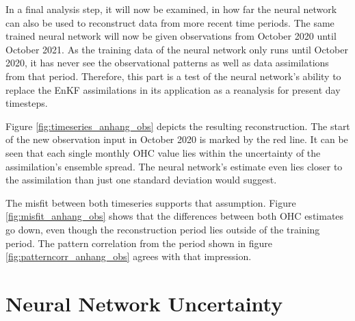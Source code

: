 \documentclass[Masterarbeit.tex]{subfile}
\begin{document}
	In a final analysis step, it will now be examined, in how far the neural network can also be used to reconstruct data from more recent time periods. The same trained neural network will now be given observations from October 2020 until October 2021. As the training data of the neural network only runs until October 2020, it has never see the observational patterns as well as data assimilations from that period. Therefore, this part is a test of the neural network's ability to replace the EnKF assimilations in its application as a reanalysis for present day timesteps. 
	
	
	Figure \ref{fig:timeseries_anhang_obs} depicts the resulting reconstruction. The start of the new observation input in October 2020 is marked by the red line. It can be seen that each single monthly OHC value lies within the uncertainty of the assimilation's ensemble spread. The neural network's estimate even lies closer to the assimilation than just one standard deviation would suggest. 
	
	
	The misfit between both timeseries supports that assumption. Figure \ref{fig:misfit_anhang_obs} shows that the differences between both OHC estimates go down, even though the reconstruction period lies outside of the training period. The pattern correlation from the period shown in figure \ref{fig:patterncorr_anhang_obs} agrees with that impression.
	
	\section{Neural Network Uncertainty} \label{uncertainty}
	
\end{document}
